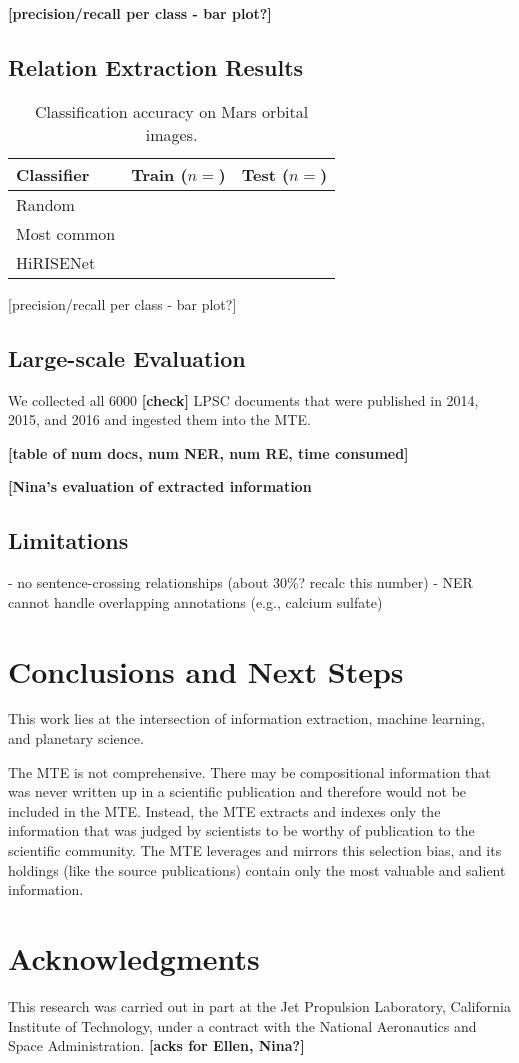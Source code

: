 \documentclass[letterpaper]{article} %
\begin{document}
{\bf [precision/recall per class - bar plot?]}

\subsection{Relation Extraction Results}

\begin{table}
\caption{Classification accuracy on Mars orbital images.}
\label{tab:hirise}
\begin{center}
\begin{tabular}{l|ll}
Classifier & Train ($n=$) & Test ($n=$) \\ \hline
Random & & \\
Most common & & \\
HiRISENet & & \\ \hline
\end{tabular}
\end{center}
\end{table}

[precision/recall per class - bar plot?]

\subsection{Large-scale Evaluation}

We collected all 6000 {\bf [check]} LPSC documents that were published
in 2014, 2015, and 2016 and ingested them into the MTE.

{\bf [table of num docs, num NER, num RE, time consumed]}

{\bf [Nina's evaluation of extracted information}

\subsection{Limitations}
- no sentence-crossing relationships (about 30\%? recalc this number)
- NER cannot handle overlapping annotations (e.g., calcium sulfate)

\section{Conclusions and Next Steps}

This work lies at the intersection of information extraction, machine
learning, and planetary science.  

The MTE is not comprehensive.  There may be compositional information
that was never written up in a scientific publication and therefore
would not be included in the MTE.  Instead, the MTE extracts and
indexes only the information that was judged by scientists to be
worthy of publication to the scientific community.  The MTE leverages
and mirrors this selection bias, and its holdings (like the source
publications) contain only the most valuable and salient information.

\section{Acknowledgments}
This research was carried out in part at the Jet Propulsion Laboratory,
California Institute of Technology, under a contract with the National
Aeronautics and Space Administration.  {\bf [acks for Ellen, Nina?]}



\end{document}

